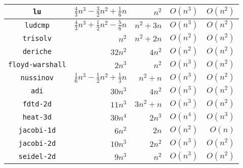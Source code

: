 \documentclass{article}
\begin{document}
\begin{table}
\begin{tabu}{|c|r|r|r|r|}
\hline
{\tt lu} & $\frac{4}{3}n^3 - \frac{3}{2}n^2 +\frac{1}{6}n$ & $n^2$ & $O(n^3)$ & $O(n^2)$\\
\hline
{\tt ludcmp} & $\frac{4}{3}n^3+\frac{1}{2}n^2 -\frac{5}{6}n$ & $n^2+3n$ & $O(n^3)$ & $O(n^2)$\\
\hline
{\tt trisolv} & $n^2$ & $n^2+2n$ & $O(n^2)$ & $O(n^2)$\\
\hline
{\tt deriche} & $32n^2$ & $4n^2$ & $O(n^2)$ & $O(n^2)$\\
\hline
{\tt floyd-warshall} & $2n^3$ & $n^2$ & $O(n^3)$ & $O(n^2)$\\
\hline
{\tt nussinov} & $\frac{1}{6}n^3 - \frac{1}{2}n^2 + \frac{1}{3}n$ & $n^2+n$ & $O(n^3)$ & $O(n^2)$\\
\hline
{\tt adi} & $30n^3$ & $4n^2$ & $O(n^3)$ & $O(n^2)$\\
\hline
{\tt fdtd-2d} & $11n^3$ & $3n^2+n$ & $O(n^3)$ & $O(n^2)$\\
\hline
{\tt heat-3d} & $30n^4$ & $2n^3$ & $O(n^4)$ & $O(n^3)$\\
\hline
{\tt jacobi-1d} & $6n^2$ & $2n$ & $O(n^2)$ & $O(n)$\\
\hline
{\tt jacobi-2d} & $10n^3$ & $2n^2$ & $O(n^3)$ & $O(n^2)$\\
\hline
{\tt seidel-2d} & $9n^3$ & $n^2$ & $O(n^3)$ & $O(n^2)$\\
\hline
\end{tabu}
\end{table}



\end{document}
